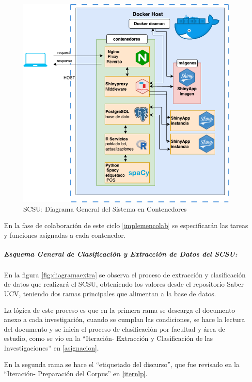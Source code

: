 \documentclass[
  12pt,
  openany]{book}
\begin{document}
\begin{figure}

{\centering \includegraphics[width=0.8\linewidth]{images/05-desarrollo/4_ciclo/digrama_contenedores_modulos} 

}

\caption{SCSU: Diagrama General del Sistema en Contenedores}\label{fig:diagramacontenedores}
\end{figure}

En la fase de colaboración de este ciclo \ref{implemencolab} se especificarán las tareas y funciones asignadas a cada contenedor.

\hypertarget{esquema-general-de-clasificaciuxf3n-y-extracciuxf3n-de-datos-del-scsu}{%
\subparagraph{Esquema General de Clasificación y Extracción de Datos del SCSU:}\label{esquema-general-de-clasificaciuxf3n-y-extracciuxf3n-de-datos-del-scsu}}

En la figura \ref{fig:diagramaextra} se observa el proceso de extracción y clasificación de datos que realizará el SCSU, obteniendo los valores desde el repositorio Saber UCV, teniendo dos ramas principales que alimentan a la base de datos.

La lógica de este proceso es que en la primera rama se descarga el documento anexo a cada investigación, cuando se cumplan las condiciones, se hace la lectura del documento y se inicia el proceso de clasificación por facultad y área de estudio, como se vio en la ``Iteración- Extracción y Clasificación de las Investigaciones'' en \ref{asignacion}.

En la segunda rama se hace el ``etiquetado del discurso'', que fue revisado en la ``Iteración- Preparación del Corpus'' en \ref{iternlp}.
\end{document}
